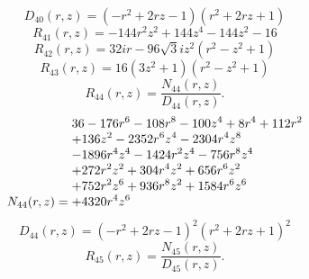 \documentclass[11pt,a4paper]{article}
\begin{document}
\begin{equation}
D_{40}(r,z)=\left(- r^{2} + 2 r z - 1\right) \left(r^{2} + 2 r z + 1\right)
\label{eq:cat-denominator-40}
\end{equation}
\begin{equation}
R_{41}(r,z)=- 144 r^{2} z^{2} + 144 z^{4} - 144 z^{2} - 16
\label{eq:cat-rational-41}
\end{equation}
\begin{equation}
R_{42}(r,z)=32 i r - 96 \sqrt{3} i z^{2} \left(r^{2} - z^{2} + 1\right)
\label{eq:cat-rational-42}
\end{equation}
\begin{equation}
R_{43}(r,z)=16 \left(3 z^{2} + 1\right) \left(r^{2} - z^{2} + 1\right)
\label{eq:cat-rational-43}
\end{equation}
\begin{equation}
R_{44}(r,z)=\frac{N_{44}(r,z)}{D_{44}(r,z)}.
\label{eq:cat-rational-44}
\end{equation}
\begin{equation}
N_{44}(r,z)=\shortstack[l]{$\displaystyle 36 - 176 r^{6} - 108 r^{8} - 100 z^{4} + 8 r^{4} + 112 r^{2}$\\
$\displaystyle  + 136 z^{2} - 2352 r^{6} z^{4} - 2304 r^{4} z^{8}$\\
$\displaystyle  - 1896 r^{4} z^{4} - 1424 r^{2} z^{4} - 756 r^{8} z^{4}$\\
$\displaystyle  + 272 r^{2} z^{2} + 304 r^{4} z^{2} + 656 r^{6} z^{2}$\\
$\displaystyle  + 752 r^{2} z^{6} + 936 r^{8} z^{2} + 1584 r^{6} z^{6}$\\
$\displaystyle  + 4320 r^{4} z^{6}$}
\label{eq:cat-numerator-44}
\end{equation}
\begin{equation}
D_{44}(r,z)=\left(- r^{2} + 2 r z - 1\right)^{2} \left(r^{2} + 2 r z + 1\right)^{2}
\label{eq:cat-denominator-44}
\end{equation}
\begin{equation}
R_{45}(r,z)=\frac{N_{45}(r,z)}{D_{45}(r,z)}.
\label{eq:cat-rational-45}
\end{equation}
\end{document}

